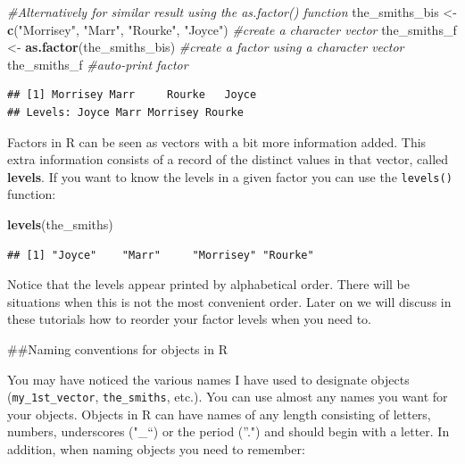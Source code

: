 \documentclass[]{book}
\newenvironment{Shaded}{\begin{snugshade}}{\end{snugshade}}
\newcommand{\CommentTok}[1]{\textcolor[rgb]{0.56,0.35,0.01}{\textit{#1}}}
\newcommand{\KeywordTok}[1]{\textcolor[rgb]{0.13,0.29,0.53}{\textbf{#1}}}
\newcommand{\NormalTok}[1]{#1}
\newcommand{\StringTok}[1]{\textcolor[rgb]{0.31,0.60,0.02}{#1}}
\theoremstyle{definition}
\theoremstyle{definition}
\theoremstyle{definition}
\theoremstyle{remark}
\begin{document}
\begin{Shaded}
\begin{Highlighting}[]
\CommentTok{#Alternatively for similar result using the as.factor() function}
\NormalTok{the_smiths_bis <-}\StringTok{ }\KeywordTok{c}\NormalTok{(}\StringTok{"Morrisey"}\NormalTok{, }\StringTok{"Marr"}\NormalTok{, }\StringTok{"Rourke"}\NormalTok{, }\StringTok{"Joyce"}\NormalTok{) }\CommentTok{#create a character vector}
\NormalTok{the_smiths_f <-}\StringTok{ }\KeywordTok{as.factor}\NormalTok{(the_smiths_bis) }\CommentTok{#create a factor using a character vector}
\NormalTok{the_smiths_f }\CommentTok{#auto-print factor}
\end{Highlighting}
\end{Shaded}

\begin{verbatim}
## [1] Morrisey Marr     Rourke   Joyce   
## Levels: Joyce Marr Morrisey Rourke
\end{verbatim}

Factors in R can be seen as vectors with a bit more information added.
This extra information consists of a record of the distinct values in
that vector, called \textbf{levels}. If you want to know the levels in a
given factor you can use the \texttt{levels()} function:

\begin{Shaded}
\begin{Highlighting}[]
\KeywordTok{levels}\NormalTok{(the_smiths)}
\end{Highlighting}
\end{Shaded}

\begin{verbatim}
## [1] "Joyce"    "Marr"     "Morrisey" "Rourke"
\end{verbatim}

Notice that the levels appear printed by alphabetical order. There will
be situations when this is not the most convenient order. Later on we
will discuss in these tutorials how to reorder your factor levels when
you need to.

\#\#Naming conventions for objects in R

You may have noticed the various names I have used to designate objects
(\texttt{my\_1st\_vector}, \texttt{the\_smiths}, etc.). You can use
almost any names you want for your objects. Objects in R can have names
of any length consisting of letters, numbers, underscores ("\_``) or the
period (''.") and should begin with a letter. In addition, when naming
objects you need to remember:
\end{document}
